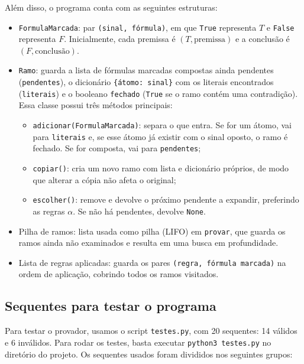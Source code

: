 \documentclass[12pt,a4paper]{article}
\begin{document}
\noindent Além disso, o programa conta com as seguintes estruturas:
\begin{itemize}
    \item \texttt{FormulaMarcada}: par \texttt{(sinal, fórmula)}, em que \texttt{True} representa $T$ e \texttt{False} representa $F$. Inicialmente, cada premissa é $(T, \text{premissa})$ e a conclusão é $(F, \text{conclusão})$.

    \item \texttt{Ramo}: guarda a lista de fórmulas marcadas compostas ainda pendentes (\texttt{pendentes}), o dicionário \texttt{\{átomo: sinal\}} com os literais encontrados (\texttt{literais}) e o booleano \texttt{fechado} (\texttt{True} se o ramo contém uma contradição). Essa classe possui três métodos principais:
    \begin{itemize}
        \item \texttt{adicionar(FormulaMarcada)}: separa o que entra. Se for um átomo, vai para \texttt{literais} e, se esse átomo já existir com o sinal oposto, o ramo é fechado. Se for composta, vai para \texttt{pendentes};
        \item \texttt{copiar()}: cria um novo ramo com lista e dicionário próprios, de modo que alterar a cópia não afeta o original;
        \item \texttt{escolher()}: remove e devolve o próximo pendente a expandir, preferindo as regras $\alpha$. Se não há pendentes, devolve \texttt{None}.
    \end{itemize}

    \item Pilha de ramos: lista usada como pilha (LIFO) em \texttt{provar}, que guarda os ramos ainda não examinados e resulta em uma busca em profundidade.

    \item Lista de regras aplicadas: guarda os pares \texttt{(regra, fórmula marcada)} na ordem de aplicação, cobrindo todos os ramos visitados.
\end{itemize}

\subsection{Sequentes para testar o programa}
Para testar o provador, usamos o script \texttt{testes.py}, com 20 sequentes: 14 válidos e 6 inválidos. Para rodar os testes, basta executar \texttt{python3 testes.py} no diretório do projeto. Os sequentes usados foram divididos nos seguintes grupos:
\end{document}
